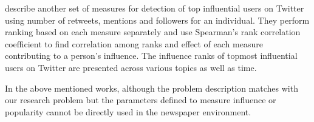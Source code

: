 \cite{cha2010measuring} describe another set of measures for detection of top influential users on Twitter using number of retweets, mentions and followers for an individual. They perform ranking based on each measure separately and use Spearman's rank correlation coefficient to find correlation among ranks and effect of each measure contributing to a person's influence. The influence ranks of topmost influential users on Twitter are presented across various topics as well as time.

In the above mentioned works, although the problem description matches with our research problem but the parameters defined to measure influence or popularity cannot be directly used in the newspaper environment. 
